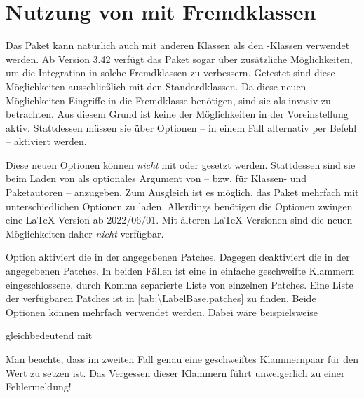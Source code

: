 \section{Nutzung von  mit Fremdklassen}

Das Paket  kann natürlich auch mit anderen Klassen als den
\KOMAScript-Klassen verwendet werden. Ab Version
3.42 verfügt das Paket sogar über
zusätzliche Möglichkeiten, um die Integration in solche Fremdklassen zu
verbessern. Getestet sind diese Möglichkeiten ausschließlich mit den
Standardklassen. Da diese neuen Möglichkeiten Eingriffe in die Fremdklasse
benötigen, sind sie als invasiv zu betrachten. Aus diesem Grund ist keine der
Möglichkeiten in der Voreinstellung aktiv. Stattdessen müssen sie über
Optionen -- in einem Fall alternativ per Befehl -- aktiviert werden.

Diese neuen Optionen können \emph{nicht} mit
 oder 
gesetzt werden. Stattdessen sind sie beim Laden von  als
optionales Argument von  -- bzw.  für
Klassen- und Paketautoren -- anzugeben. Zum Ausgleich ist es möglich, das
Paket mehrfach mit unterschiedlichen Optionen zu laden.
Allerdings benötigen die Optionen zwingen eine
\LaTeX-Version ab
2022/06/01. Mit älteren \LaTeX-Versionen sind die neuen Möglichkeiten daher
\emph{nicht} verfügbar.

\begin{Declaration}
\end{Declaration}
Option  aktiviert die
in der  angegebenen Patches. Dagegen deaktiviert
 die in der  angegebenen Patches. In
beiden Fällen ist  eine in einfache geschweifte Klammern
eingeschlossene, durch Komma separierte Liste von einzelnen Patches. Eine
Liste der verfügbaren Patches ist in \autoref{tab:\LabelBase.patches} zu
finden. Beide Optionen können mehrfach verwendet werden. Dabei wäre
beispielsweise
\begin{lstcode}
  \usepackage[enablepatch=chapter,enablepatch=listoffigures]{tocbasic}
\end{lstcode}
gleichbedeutend mit
\begin{lstcode}
  \usepackage[enablepatch={chapter,listoffigure}]{tocbasic}
\end{lstcode}
Man beachte, dass im zweiten Fall genau eine geschweiftes Klammernpaar für den
Wert zu setzen ist. Das Vergessen dieser Klammern führt unweigerlich zu einer
Fehlermeldung!

